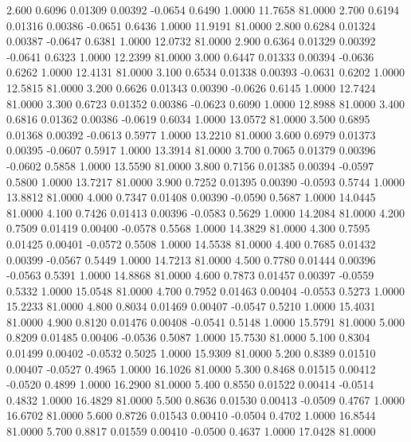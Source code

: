    2.600   0.6096   0.01309   0.00392  -0.0654   0.6490   1.0000  11.7658  81.0000
   2.700   0.6194   0.01316   0.00386  -0.0651   0.6436   1.0000  11.9191  81.0000
   2.800   0.6284   0.01324   0.00387  -0.0647   0.6381   1.0000  12.0732  81.0000
   2.900   0.6364   0.01329   0.00392  -0.0641   0.6323   1.0000  12.2399  81.0000
   3.000   0.6447   0.01333   0.00394  -0.0636   0.6262   1.0000  12.4131  81.0000
   3.100   0.6534   0.01338   0.00393  -0.0631   0.6202   1.0000  12.5815  81.0000
   3.200   0.6626   0.01343   0.00390  -0.0626   0.6145   1.0000  12.7424  81.0000
   3.300   0.6723   0.01352   0.00386  -0.0623   0.6090   1.0000  12.8988  81.0000
   3.400   0.6816   0.01362   0.00386  -0.0619   0.6034   1.0000  13.0572  81.0000
   3.500   0.6895   0.01368   0.00392  -0.0613   0.5977   1.0000  13.2210  81.0000
   3.600   0.6979   0.01373   0.00395  -0.0607   0.5917   1.0000  13.3914  81.0000
   3.700   0.7065   0.01379   0.00396  -0.0602   0.5858   1.0000  13.5590  81.0000
   3.800   0.7156   0.01385   0.00394  -0.0597   0.5800   1.0000  13.7217  81.0000
   3.900   0.7252   0.01395   0.00390  -0.0593   0.5744   1.0000  13.8812  81.0000
   4.000   0.7347   0.01408   0.00390  -0.0590   0.5687   1.0000  14.0445  81.0000
   4.100   0.7426   0.01413   0.00396  -0.0583   0.5629   1.0000  14.2084  81.0000
   4.200   0.7509   0.01419   0.00400  -0.0578   0.5568   1.0000  14.3829  81.0000
   4.300   0.7595   0.01425   0.00401  -0.0572   0.5508   1.0000  14.5538  81.0000
   4.400   0.7685   0.01432   0.00399  -0.0567   0.5449   1.0000  14.7213  81.0000
   4.500   0.7780   0.01444   0.00396  -0.0563   0.5391   1.0000  14.8868  81.0000
   4.600   0.7873   0.01457   0.00397  -0.0559   0.5332   1.0000  15.0548  81.0000
   4.700   0.7952   0.01463   0.00404  -0.0553   0.5273   1.0000  15.2233  81.0000
   4.800   0.8034   0.01469   0.00407  -0.0547   0.5210   1.0000  15.4031  81.0000
   4.900   0.8120   0.01476   0.00408  -0.0541   0.5148   1.0000  15.5791  81.0000
   5.000   0.8209   0.01485   0.00406  -0.0536   0.5087   1.0000  15.7530  81.0000
   5.100   0.8304   0.01499   0.00402  -0.0532   0.5025   1.0000  15.9309  81.0000
   5.200   0.8389   0.01510   0.00407  -0.0527   0.4965   1.0000  16.1026  81.0000
   5.300   0.8468   0.01515   0.00412  -0.0520   0.4899   1.0000  16.2900  81.0000
   5.400   0.8550   0.01522   0.00414  -0.0514   0.4832   1.0000  16.4829  81.0000
   5.500   0.8636   0.01530   0.00413  -0.0509   0.4767   1.0000  16.6702  81.0000
   5.600   0.8726   0.01543   0.00410  -0.0504   0.4702   1.0000  16.8544  81.0000
   5.700   0.8817   0.01559   0.00410  -0.0500   0.4637   1.0000  17.0428  81.0000
